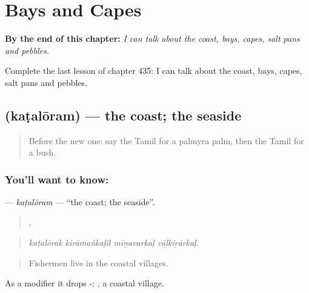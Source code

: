 
\chapter{Bays and Capes}
\label{ch:ta-bays-and-capes}

\begin{chapteropening}
\textbf{By the end of this chapter:} \emph{I can talk about the coast, bays, capes, salt pans and pebbles.}

Complete the last lesson of chapter 435: I can talk about the coast, bays, capes, salt pans and pebbles.
\end{chapteropening}

\section[\texorpdfstring{\ta{கடலோரம்} (kaṭalōram)}{கடலோரம் (kaṭalōram)}]{ (kaṭalōram) — the coast; the seaside}

\label{lesson:TA-C435-kataloram}



\begin{quote}
Before the new one: say the Tamil for a palmyra palm, then the Tamil for a bush.
\end{quote}

\subsection*{You'll want to know: }
\textbf{} — \emph{kaṭalōram} — \textquotedblleft{}the coast; the seaside\textquotedblright{}.

\begin{quote}
   .
\end{quote}

\begin{quote}
\emph{kaṭalōrak kirāmaṅkaḷil mīṉavarkaḷ vāḻkiṟārkaḷ.}
\end{quote}

\begin{quote}
Fishermen live in the coastal villages.
\end{quote}

As a modifier it drops -:  , a coastal village.

